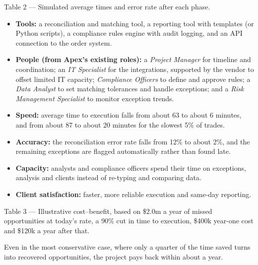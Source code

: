 \documentclass[11pt]{article}
\let\oldsubheading\subheading
\renewcommand{\subheading}[1]{\Needspace{6\baselineskip}\oldsubheading{#1}}
\let\oldheading\heading
\renewcommand{\heading}[1]{\Needspace{8\baselineskip}\oldheading{#1}}
\begin{document}
\begin{center}
  \small\par\smallskip
  {\color{gray}Table 2 --- Simulated average times and error rate after each
  phase.}
\end{center}

\begin{itemize}[leftmargin=1.5em, itemsep=2pt]
  \item \textbf{Tools:} a reconciliation and matching tool, a reporting tool
  with templates (or Python scripts), a compliance rules engine with audit
  logging, and an API connection to the order system.
  \item \textbf{People (from Apex's existing roles):} a \emph{Project
  Manager} for timeline and coordination; an \emph{IT Specialist} for the
  integrations, supported by the vendor to offset limited IT capacity;
  \emph{Compliance Officers} to define and approve rules; a \emph{Data
  Analyst} to set matching tolerances and handle exceptions; and a \emph{Risk
  Management Specialist} to monitor exception trends.
\end{itemize}


\begin{itemize}[leftmargin=1.5em, itemsep=2pt]
  \item \textbf{Speed:} average time to execution falls from about 63 to about
  6 minutes, and from about 87 to about 20 minutes for the slowest 5\% of
  trades.
  \item \textbf{Accuracy:} the reconciliation error rate falls from 12\% to
  about 2\%, and the remaining exceptions are flagged automatically rather
  than found late.
  \item \textbf{Capacity:} analysts and compliance officers spend their time
  on exceptions, analysis and clients instead of re-typing and comparing
  data.
  \item \textbf{Client satisfaction:} faster, more reliable execution and
  same-day reporting.
\end{itemize}

\begin{center}
  \small\par\smallskip
  {\color{gray}Table 3 --- Illustrative cost--benefit, based on \$2.0m a year
  of missed opportunities at today's rate, a 90\% cut in time to execution,
  \$400k year-one cost and \$120k a year after that.}
\end{center}
Even in the most conservative case, where only a quarter of the time saved
turns into recovered opportunities, the project pays back within about a year.
\end{document}

